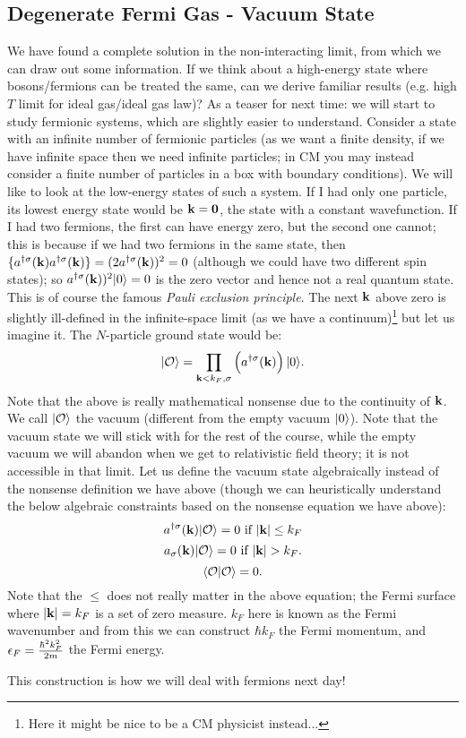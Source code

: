 \subsection{Degenerate Fermi Gas - Vacuum State}
We have found a complete solution in the non-interacting limit, from which we can draw out some information. If we think about a high-energy state where bosons/fermions can be treated the same, can we derive familiar results (e.g. high $T$ limit for ideal gas/ideal gas law)? As a teaser for next time: we will start to study fermionic systems, which are slightly easier to understand. Consider a state with an infinite number of fermionic particles (as we want a finite density, if we have infinite space then we need infinite particles; in CM you may instead consider a finite number of particles in a box with boundary conditions). We will like to look at the low-energy states of such a system. If I had only one particle, its lowest energy state would be $\mathbf{k} = \mathbf{0}$, the state with a constant wavefunction. If I had two fermions, the first can have energy zero, but the second one cannot; this is because if we had two fermions in the same state, then $\{a^{\dagger\sigma}(\mathbf{k})a^{\dagger\sigma}(\mathbf{k})\} = (2a^{\dagger\sigma}(\mathbf{k}))^2 = 0$ (although we could have two different spin states); so $a^{\dagger\sigma}(\mathbf{k}))^2\lvert 0 \rangle = 0$ is the zero vector and hence not a real quantum state. This is of course the famous \emph{Pauli exclusion principle}. The next $\mathbf{k}$ above zero is slightly ill-defined in the infinite-space limit (as we have a continuum)\footnote{Here it might be nice to be a CM physicist instead...} but let us imagine it. The $N$-particle ground state would be:
\begin{equation}
    \lvert \mathcal{O} \rangle = \prod_{\mathbf{k} < k_F, \sigma}\left(a^{\dagger\sigma}(\mathbf{k})\right)\lvert 0 \rangle.
\end{equation}
Note that the above is really mathematical nonsense due to the continuity of $\mathbf{k}$. We call $\lvert \mathcal{O} \rangle$ the vacuum (different from the empty vacuum $\lvert 0 \rangle$). Note that the vacuum state we will stick with for the rest of the course, while the empty vacuum we will abandon when we get to relativistic field theory; it is not accessible in that limit. Let us define the vacuum state algebraically instead of the nonsense definition we have above (though we can heuristically understand the below algebraic constraints based on the nonsense equation we have above):
\begin{equation}
    a^{\dagger\sigma}(\mathbf{k})\lvert \mathcal{O} \rangle = 0 \text{ if } \lvert \mathbf{k} \rvert \leq k_F
\end{equation}
\begin{equation}
    a_\sigma(\mathbf{k})\lvert \mathcal{O} \rangle = 0 \text{ if } \lvert \mathbf{k} \rvert > k_F.
\end{equation}
\begin{equation}
    \langle \mathcal{O} \lvert \mathcal{O} \rangle = 0.
\end{equation}
Note that the $\leq$ does not really matter in the above equation; the Fermi surface where $\lvert \mathbf{k} \rvert = k_F$ is a set of zero measure. $k_F$ here is known as the Fermi wavenumber and from this we can construct $\hbar k_F$ the Fermi momentum, and $\epsilon_F = \frac{\hbar^2 k_F^2}{2m}$ the Fermi energy. 

This construction is how we will deal with fermions next day!



